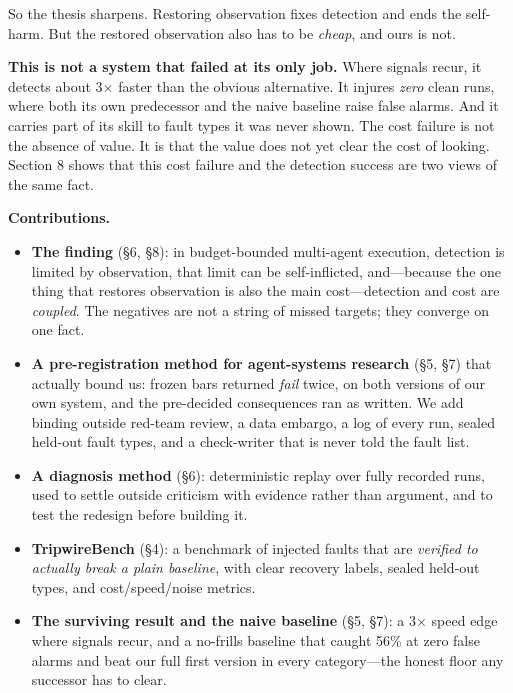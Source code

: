\documentclass[acmsmall,screen]{acmart}
\begin{document}
So the thesis sharpens. Restoring observation fixes detection and ends the
self-harm. But the restored observation also has to be \emph{cheap}, and ours
is not.

\textbf{This is not a system that failed at its only job.} Where signals
recur, it detects about 3$\times$ faster than the obvious alternative. It
injures \emph{zero} clean runs, where both its own predecessor and the naive
baseline raise false alarms. And it carries part of its skill to fault types it
was never shown. The cost failure is not the absence of value. It is that the
value does not yet clear the cost of looking. Section 8 shows that this cost
failure and the detection success are two views of the same fact.

\textbf{Contributions.}
\begin{itemize}
  \item \textbf{The finding} (\S6, \S8): in budget-bounded multi-agent
  execution, detection is limited by observation, that limit can be
  self-inflicted, and---because the one thing that restores observation is also
  the main cost---detection and cost are \emph{coupled}. The negatives are not
  a string of missed targets; they converge on one fact.
  \item \textbf{A pre-registration method for agent-systems research} (\S5,
  \S7) that actually bound us: frozen bars returned \emph{fail} twice, on both
  versions of our own system, and the pre-decided consequences ran as written.
  We add binding outside red-team review, a data embargo, a log of every run,
  sealed held-out fault types, and a check-writer that is never told the fault
  list.
  \item \textbf{A diagnosis method} (\S6): deterministic replay over fully
  recorded runs, used to settle outside criticism with evidence rather than
  argument, and to test the redesign before building it.
  \item \textbf{TripwireBench} (\S4): a benchmark of injected faults that are
  \emph{verified to actually break a plain baseline}, with clear recovery
  labels, sealed held-out types, and cost/speed/noise metrics.
  \item \textbf{The surviving result and the naive baseline} (\S5, \S7): a
  3$\times$ speed edge where signals recur, and a no-frills baseline that
  caught 56\% at zero false alarms and beat our full first version in every
  category---the honest floor any successor has to clear.
\end{itemize}
\end{document}
